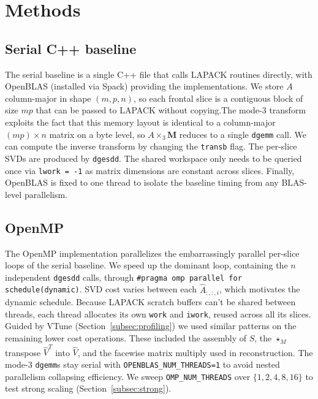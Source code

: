 \documentclass{article}
\begin{document}
\section{Methods}
\label{sec:methods}

\subsection{Serial C++ baseline}
The serial baseline is a single C++ file that calls LAPACK routines directly, 
with OpenBLAS (installed via Spack) providing the implementations. We
store $A$ column-major in shape $(m, p, n)$, so each frontal slice is a contiguous
block of size $mp$ that can be passed to LAPACK without copying.The mode-3 transform exploits the fact that this memory layout is identical to a column-major
$(mp) \times n$ matrix on a byte level, so $A \times_3 \mathbf{M}$ reduces to a single
\texttt{dgemm} call. We can compute the inverse transform by changing the 
\texttt{transb} flag. The per-slice SVDs are produced by
\texttt{dgesdd}. The shared workspace only needs to be queried once via 
\texttt{lwork = -1} as matrix dimensions are constant across slices. Finally, OpenBLAS
is fixed to one thread to isolate the baseline timing from any BLAS-level parallelism.

\subsection{OpenMP}
The OpenMP implementation parallelizes the embarrassingly parallel per-slice loops of the serial
baseline. We speed up the dominant loop, containing the $n$
independent \texttt{dgesdd} calls, through 
\texttt{\#pragma omp parallel for schedule(dynamic)}. 
SVD cost varies between each $\hat{A}_{:,:,i}$, which motivates the dynamic schedule. 
Because LAPACK scratch buffers can't be shared between threads, each thread allocates its own \texttt{work} and \texttt{iwork}, reused across all its slices.
Guided by  VTune (Section~\ref{subsec:profiling}) we used similar patterns on the 
remaining lower cost operations. 
These included the assembly of $\hat{S}$, the $\star_M$ transpose 
$\hat{V}^T$ into $\hat{V}$, and the facewise matrix multiply used in reconstruction. 
 The mode-3 \texttt{dgemm}s stay serial with
\texttt{OPENBLAS\_NUM\_THREADS=1} to avoid nested parallelism
collapsing efficiency. We sweep \texttt{OMP\_NUM\_THREADS} over
$\{1, 2, 4, 8, 16\}$ to test strong scaling (Section~\ref{subsec:strong}).
\end{document}
